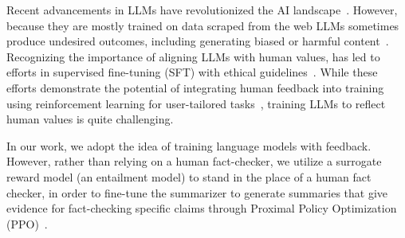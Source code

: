 Recent advancements in LLMs have revolutionized the AI landscape~\cite{touvron2023llama1, touvron2023llama, driess2023palme, openai2023gpt4}. However, because they are mostly trained on data scraped from the web LLMs sometimes produce undesired outcomes, including generating biased or harmful content~\cite{10.1145/3442188.3445922}. Recognizing the importance of aligning LLMs with human values,   has led to efforts in supervised fine-tuning (SFT) with ethical guidelines~\cite{alpaca}. While these efforts demonstrate the potential of integrating human feedback into training using reinforcement learning for user-tailored tasks~\cite{ouyang2022training, bai2022training}, training LLMs to reflect human values is quite challenging. 

In our work, we adopt the idea of training language models with feedback. However, rather than relying on a human fact-checker, we utilize a surrogate reward model (an entailment model) to stand in the place of a human fact checker, in order to fine-tune the summarizer to generate summaries that give evidence for fact-checking specific claims through Proximal Policy Optimization (PPO)~\cite{schulman2017proximal, zheng2023secrets}.
